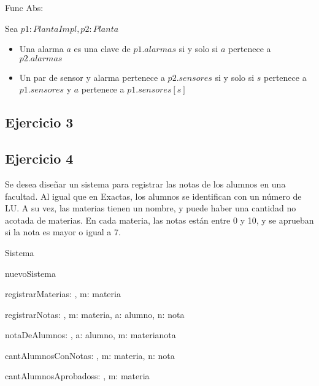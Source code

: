 Func Abs:

Sea $p1: PlantaImpl, p2: Planta$
\begin{itemize}
	\item Una alarma $a$ es una clave de $p1.alarmas$ si y solo si $a$ pertenece a $p2.alarmas$
	\item Un par de sensor y alarma  pertenece a $p2.sensores$ si y solo si $s$ pertenece a $p1.sensores$ y $a$ pertenece a $p1.sensores[s]$
\end{itemize}

\subsection{Ejercicio 3}
\hacer

\subsection{Ejercicio 4}
Se desea diseñar un sistema para registrar las notas de los alumnos en una facultad. Al igual que en Exactas, los alumnos se identifican con un número de LU. A su vez, las materias tienen un nombre, y puede haber una cantidad no acotada de materias. En cada materia, las notas están entre 0 y 10, y se aprueban si la nota es mayor o igual a 7.
\bigskip

\begin{tad}{Sistema}{}

	\begin{proc}{nuevoSistema}{}{\tadtype}
	\end{proc}
	\begin{proc}{registrarMateria}{\Inout s: \tadtype, \In m: materia}{}
	\end{proc}
	\begin{proc}{registrarNota}{\Inout s: \tadtype, \In m: materia, \In a: alumno, \In n: nota}{}
	\end{proc}
	\begin{proc}{notaDeAlumno}{\In s: \tadtype, \In a: alumno, \In m: materia}{nota}
	\end{proc}
	\begin{proc}{cantAlumnosConNota}{\In s: \tadtype, \In m: materia, \In n: nota}{\ent}
	\end{proc}
	\begin{proc}{cantAlumnosAprobados}{\In s: \tadtype, \In m: materia}{\ent}
	\end{proc}
\end{tad}

